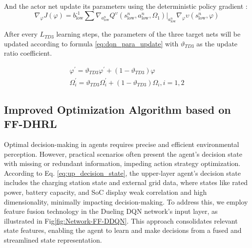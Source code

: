 \documentclass[preprint,12pt]{elsarticle}
\begin{document}
And the actor net update its parameters using the deterministic policy gradient \cite{pmlr-v80-fujimoto18a}:
\begin{equation}
\nabla_{\varphi}J(\varphi)=b_{\textrm{low}}^{\textrm{-1}}\sum\nabla_{a_{\textrm{low}}^{n}}Q^{\upsilon}(s_{\textrm{low}}^{n},a_{\textrm{low}}^{n},\Omega_{1})\Biggl|_{a_{\textrm{low}}^{n}}
\nabla_{\varphi}\upsilon(s_{\textrm{low}}^{n},\varphi)
\label{eq:policy_gra}
\end{equation}


After every $L_{TD3}$ learning steps, the parameters of the three target nets will be updated according to formula \ref{eq:dqn_para_update} with $\vartheta_{TD3}$ as the update ratio coefficient.

\begin{equation}
\begin{array}{c}
\varphi^{'}=\vartheta_{TD3}\varphi^{'}+(1-\vartheta_{TD3})\varphi\\
\Omega_{i}^{'}=\vartheta_{TD3}\Omega_{i}^{'}+(1-\vartheta_{TD3})\Omega_{i},i=1,2
\end{array}
\end{equation}


\subsection{Improved Optimization Algorithm based on FF-DHRL}

Optimal decision-making in agents requires precise and efficient environmental perception. However, practical scenarios often present the agent's decision state with missing or redundant information, impeding action strategy optimization. According to Eq. \ref{eq:up_decision_state}, the upper-layer agent's decision state includes the charging station state and external grid data, where states like rated power, battery
capacity, and SoC display weak correlation and high dimensionality, minimally impacting decision-making. To address this, we employ feature fusion technology in the Dueling DQN network's input layer, as illustrated
in Fig\ref{fig:Network-FF-DDQN}. This approach consolidates relevant state features, enabling the agent to learn and make decisions from a fused and streamlined state representation.
\end{document}
